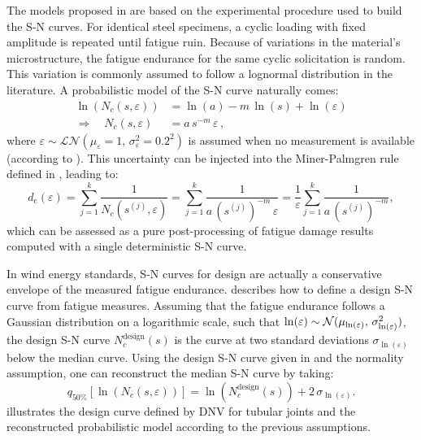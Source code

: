 The models proposed in \citet{guede_2007} are based on the experimental procedure used to build the S-N curves. 
For identical steel specimens, a cyclic loading with fixed amplitude is repeated until fatigue ruin. 
Because of variations in the material's microstructure, the fatigue endurance for the same cyclic solicitation is random. 
This variation is commonly assumed to follow a lognormal distribution in the literature. 
A probabilistic model of the S-N curve naturally comes: 
\begin{subequations}
    \begin{align}
        \ln(N_c(s, \varepsilon)) &= \ln(a) - m \, \ln(s) + \ln(\varepsilon)\\
        \Rightarrow  \quad N_c(s, \varepsilon) &= a \, s^{-m} \, \varepsilon \, ,
    \end{align}
\end{subequations}
where $\varepsilon \sim \mathcal{LN}(\mu_\varepsilon=1, \, \sigma^2_\varepsilon=0.2^2)$  is assumed when no measurement is available (according to \citealp[Appendix F.5]{dnv_fatigue_2016}). 
This uncertainty can be injected into the Miner-Palmgren rule defined in , leading to: 
\begin{equation}
    d_{\mathrm{c}}(\varepsilon) = \sum_{j=1}^k \frac{1}{N_c(s^{(j)}, \varepsilon)}
            = \sum_{j=1}^k \frac{1}{a \, \left(s^{(j)}\right)^{-m} \, \varepsilon}
            = \frac{1}{\varepsilon} \sum_{j=1}^k \frac{1}{a \, \left(s^{(j)}\right)^{-m}},
\end{equation}
which can be assessed as a pure post-processing of fatigue damage results computed with a single deterministic S-N curve. 

In wind energy standards, S-N curves for design are actually a conservative envelope of the measured fatigue endurance. 
\citet[Appendix F.7]{dnv_fatigue_2016} describes how to define a design S-N curve from fatigue measures. 
Assuming that the fatigue endurance follows a Gaussian distribution on a logarithmic scale, such that $\mathrm{ln}(\varepsilon) \sim \mathcal{N}(\mu_{\mathrm{ln}(\varepsilon)}, \, \sigma^2_{\mathrm{ln}(\varepsilon)})$, the design S-N curve $N_c^{\mathrm{design}}(s)$ is the curve at two standard deviations $\sigma_{\ln(\varepsilon)}$ below the median curve. 
Using the design S-N curve given in \citet[Sec. 2.4.6]{dnv_fatigue_2016} and the normality assumption, one can reconstruct the median S-N curve by taking: 
\begin{equation}
    q_{50\%}[\ln(N_c(s, \varepsilon))]= \ln\left(N_c^{\mathrm{design}}(s)\right) + 2 \, \sigma_{\ln(\varepsilon)}. 
\end{equation}
 illustrates the design curve defined by DNV for tubular joints \citet[Sec. 2.4.6]{dnv_fatigue_2016} and the reconstructed probabilistic model according to the previous assumptions. 

